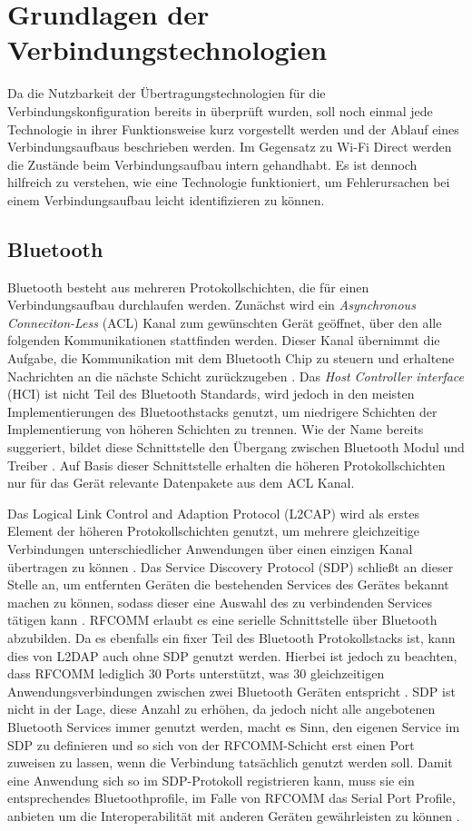 \section{Grundlagen der Verbindungstechnologien}
	Da die Nutzbarkeit der Übertragungstechnologien für die Verbindungskonfiguration bereits in \cite{aiProject} überprüft wurden, soll noch einmal jede Technologie in ihrer Funktionsweise kurz vorgestellt werden und der Ablauf eines Verbindungsaufbaus beschrieben werden. Im Gegensatz zu Wi-Fi Direct werden die Zustände beim Verbindungsaufbau intern gehandhabt. Es ist dennoch hilfreich zu verstehen, wie eine Technologie funktioniert, um Fehlerursachen bei einem Verbindungsaufbau leicht identifizieren zu können.
	
	\subsection{Bluetooth}
	Bluetooth besteht aus mehreren Protokollschichten, die für einen Verbindungsaufbau durchlaufen werden. Zunächst wird ein {\it Asynchronous Conneciton-Less} (ACL) Kanal zum gewünschten Gerät geöffnet, über den alle folgenden Kommunikationen stattfinden werden. Dieser Kanal übernimmt die Aufgabe, die Kommunikation mit dem Bluetooth Chip zu steuern und erhaltene Nachrichten an die nächste Schicht zurückzugeben \cite[S.400]{Sauter}. Das {\it Host Controller interface} (HCI) ist nicht Teil des Bluetooth Standards, wird jedoch in den meisten Implementierungen des Bluetoothstacks genutzt, um niedrigere Schichten der Implementierung von höheren Schichten zu trennen. Wie der Name bereits suggeriert, bildet diese Schnittstelle den Übergang zwischen Bluetooth Modul und Treiber \cite[S.65]{miller}. Auf Basis dieser Schnittstelle erhalten die höheren Protokollschichten nur für das Gerät relevante Datenpakete aus dem ACL Kanal.
	
	Das Logical Link Control and Adaption Protocol (L2CAP) wird als erstes Element der höheren Protokollschichten genutzt, um mehrere gleichzeitige Verbindungen unterschiedlicher Anwendungen über einen einzigen Kanal übertragen zu können \cite[S.395]{Sauter}. Das Service Discovery Protocol (SDP) schließt an dieser Stelle an, um entfernten Geräten die bestehenden Services des Gerätes bekannt machen zu können, sodass dieser eine Auswahl des zu verbindenden Services tätigen kann \cite[S.395]{morrow}. RFCOMM erlaubt es eine serielle Schnittstelle über Bluetooth abzubilden. Da es ebenfalls ein fixer Teil des Bluetooth Protokollstacks ist, kann dies von L2DAP auch ohne SDP genutzt werden. Hierbei ist jedoch zu beachten, dass RFCOMM lediglich 30 Ports unterstützt, was 30 gleichzeitigen Anwendungsverbindungen zwischen zwei Bluetooth Geräten entspricht \cite[S.398]{Sauter}. SDP ist nicht in der Lage, diese Anzahl zu erhöhen, da jedoch nicht alle angebotenen Bluetooth Services immer genutzt werden, macht es Sinn, den eigenen Service im SDP zu definieren und so sich von der RFCOMM-Schicht erst einen Port zuweisen zu lassen, wenn die Verbindung tatsächlich genutzt werden soll. Damit eine Anwendung sich so im SDP-Protokoll registrieren kann, muss sie ein entsprechendes Bluetoothprofile, im Falle von RFCOMM das Serial Port Profile, anbieten um die Interoperabilität mit anderen Geräten gewährleisten zu können \cite[S.411]{Sauter}.
	
